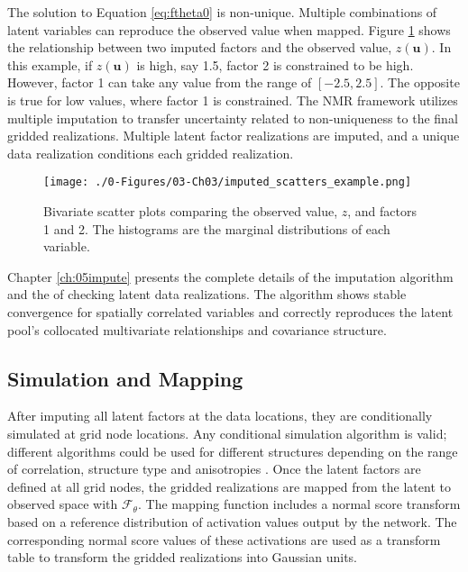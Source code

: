 The solution to Equation \ref{eq:ftheta0} is non-unique. Multiple combinations of latent variables can reproduce the observed value when mapped. Figure \ref{fig:imputed_scatters_example} shows the relationship between two imputed factors and the observed value, $z(\mathbf{u})$. In this example, if $z(\mathbf{u})$ is high, say 1.5, factor 2 is constrained to be high. However, factor 1 can take any value from the range of $[-2.5, 2.5]$. The opposite is true for low values, where factor 1 is constrained. The \gls{NMR} framework utilizes multiple imputation to transfer uncertainty related to non-uniqueness to the final gridded realizations. Multiple latent factor realizations are imputed, and a unique data realization conditions each gridded realization.

\begin{figure}[htb!]
    \centering
    \texttt{[image: ./0-Figures/03-Ch03/imputed\_scatters\_example.png]}
    \caption{Bivariate scatter plots comparing the observed value, $z$, and factors 1 and 2. The histograms are the marginal distributions of each variable. }
    \label{fig:imputed_scatters_example}
\end{figure}

Chapter \ref{ch:05impute} presents the complete details of the imputation algorithm and the of checking latent data realizations. The algorithm shows stable convergence for spatially correlated variables and correctly reproduces the latent pool's collocated multivariate relationships and covariance structure.

\FloatBarrier
\subsection{Simulation and Mapping}
\label{subsec:03simulate}

After imputing all latent factors at the data locations, they are conditionally simulated at grid node locations. Any conditional simulation algorithm is valid; different algorithms could be used for different structures depending on the range of correlation, structure type and anisotropies \citep{pinto2020independent}. Once the latent factors are defined at all grid nodes, the gridded realizations are mapped from the latent to observed space with $\mathcal{F}_{\theta}$. The mapping function includes a normal score transform based on a reference distribution of activation values output by the network. The corresponding normal score values of these activations are used as a transform table to transform the gridded realizations into Gaussian units.

